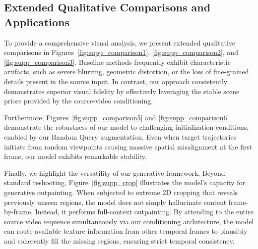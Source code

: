 \subsection{Extended Qualitative Comparisons and Applications} 
\label{sec:supp_comparisons}



To provide a comprehensive visual analysis, we present extended qualitative comparisons in Figures~\ref{fig:supp_comparison1}, \ref{fig:supp_comparison2}, and \ref{fig:supp_comparison3}. Baseline methods frequently exhibit characteristic artifacts, such as severe blurring, geometric distortion, or the loss of fine-grained details present in the source input. In contrast, our approach consistently demonstrates superior visual fidelity by effectively leveraging the stable scene priors provided by the source-video conditioning.

Furthermore, Figures~\ref{fig:supp_comparison5} and \ref{fig:supp_comparison6} demonstrate the robustness of our model to challenging initialization conditions, enabled by our Random Query augmentation. Even when target trajectories initiate from random viewpoints causing massive spatial misalignment at the first frame, our model exhibits remarkable stability.

Finally, we highlight the versatility of our generative framework. Beyond standard reshooting, Figure~\ref{fig:supp_crop} illustrates the model's capacity for generative outpainting. When subjected to extreme 2D cropping that reveals previously unseen regions, the model does not simply hallucinate content frame-by-frame. Instead, it performs full-context outpainting. By attending to the entire source video sequence simultaneously via our conditioning architecture, the model can route available texture information from other temporal frames to plausibly and coherently fill the missing regions, ensuring strict temporal consistency.